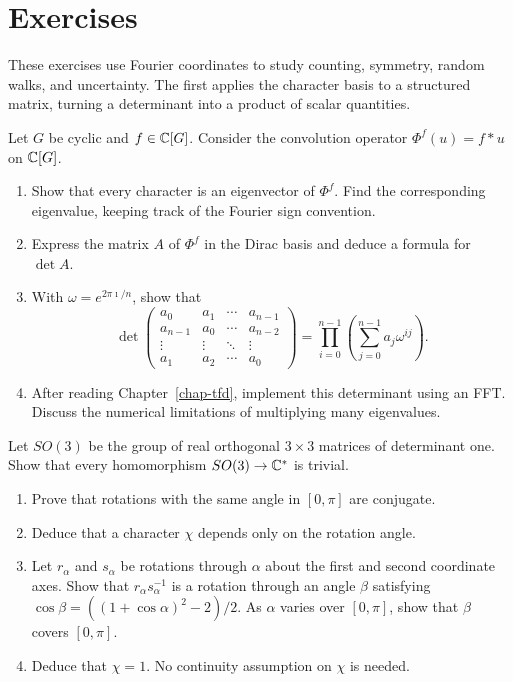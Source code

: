 \section{Exercises}
\label{sect1-chap1-exercises}

These exercises use Fourier coordinates to study counting, symmetry, random
walks, and uncertainty. The first applies the character basis to a
structured matrix, turning a determinant into a product of scalar
quantities.

\begin{exo}
\label{exo-determinant-circulating}
Let $G$ be cyclic and $f\in\mathbb{C}[G]$. Consider the convolution operator
$\Phi^f(u)=f*u$ on $\mathbb{C}[G]$.
\begin{enumerate}
\item Show that every character is an eigenvector of $\Phi^f$. Find the
corresponding eigenvalue, keeping track of the Fourier sign convention.
\item Express the matrix $A$ of $\Phi^f$ in the Dirac basis and deduce a
formula for $\det A$.
\item With $\omega=e^{2\pi\imath/n}$, show that
\[
 \det\begin{pmatrix}
 a_0&a_1&\cdots&a_{n-1}\\
 a_{n-1}&a_0&\cdots&a_{n-2}\\
 \vdots&\vdots&\ddots&\vdots\\
 a_1&a_2&\cdots&a_0
 \end{pmatrix}
 =\prod_{i=0}^{n-1}\left(\sum_{j=0}^{n-1}a_j\omega^{ij}\right).
\]
\item After reading Chapter~\ref{chap-tfd}, implement this determinant using
an FFT. Discuss the numerical limitations of multiplying many eigenvalues.
\end{enumerate}
\end{exo}


\begin{exo}
\label{exo-dual-so3}
Let $SO(3)$ be the group of real orthogonal $3\times3$ matrices of determinant
one. Show that every homomorphism $SO(3)\to\mathbb{C}^*$ is trivial.
\begin{enumerate}
\item Prove that rotations with the same angle in $[0,\pi]$ are conjugate.
\item Deduce that a character $\chi$ depends only on the rotation angle.
\item Let $r_\alpha$ and $s_\alpha$ be rotations through $\alpha$ about the
first and second coordinate axes. Show that $r_\alpha s_\alpha^{-1}$ is a
rotation through an angle $\beta$ satisfying
$\cos\beta=((1+\cos\alpha)^2-2)/2$.
As $\alpha$ varies over $[0,\pi]$, show that $\beta$ covers $[0,\pi]$.
\item Deduce that $\chi=1$. No continuity assumption on $\chi$ is needed.
\end{enumerate}
\end{exo}

